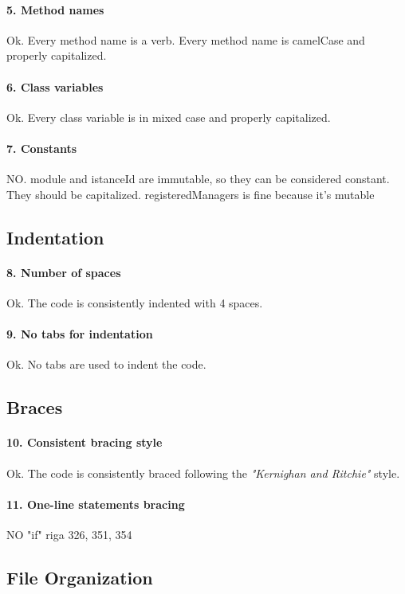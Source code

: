 \documentclass[english]{article}
\begin{document}
\paragraph{5. Method names}
Ok.
Every method name is a verb.
Every method name is camelCase and properly capitalized.

\paragraph{6. Class variables}
Ok.
Every class variable is in mixed case and properly capitalized.

\paragraph{7. Constants}
NO.
module and istanceId are immutable, so they can be considered constant. They should be capitalized.
registeredManagers is fine because it's mutable

\subsection{Indentation}
\paragraph{8. Number of spaces}
Ok.
The code is consistently indented with 4 spaces.

\paragraph{9. No tabs for indentation}
Ok.
No tabs are used to indent the code.

\subsection{Braces}
\paragraph{10. Consistent bracing style}
Ok.
The code is consistently braced following the \textit{"Kernighan and Ritchie"} style.

\paragraph{11. One-line statements bracing}
NO
"if" riga 326, 351, 354

\subsection{File Organization}
\end{document}
